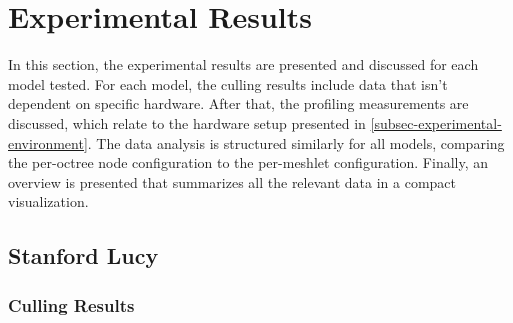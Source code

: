 \section{Experimental Results}

In this section, the experimental results are presented and discussed for each model tested.
For each model, the culling results include data that isn't dependent on specific hardware. 
After that, the profiling measurements are discussed, which relate to the hardware setup presented 
in \ref{subsec-experimental-environment}. The data analysis is structured similarly for all models,
comparing the per-octree node configuration to the per-meshlet configuration. Finally, an overview 
is presented that summarizes all the relevant data in a compact visualization.


\subsection*{Stanford Lucy}

\subsubsection*{Culling Results} \label{subsubsec-culling-results-lucy}


